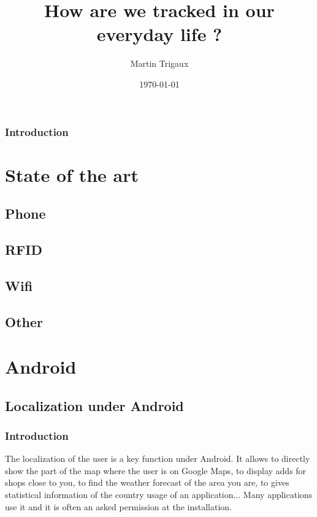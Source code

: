\documentclass{report}
\title{How are we tracked in our everyday life ?}
\author{Martin Trigaux}
\date{\today}
\begin{document}
\maketitle

\dominitoc

\section*{Introduction}

\part{State of the art}
\label{chap:general}

\chapter{Phone}

\chapter{RFID}

\chapter{Wifi}

\chapter{Other}

\part{Android}
\label{chap:android}
\minitoc

\chapter{Localization under Android}

\section*{Introduction}
The localization of the user is a key function under Android. It allows to directly show the part of the map where the user is on Google  Maps, to display adds for shops close to you, to find the weather forecast of the area you are, to gives statistical information of the country usage of an application... Many applications use it and it is often an asked permission at the installation.\\
\end{document}
